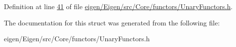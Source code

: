 Definition at line \hyperlink{eigen_2_eigen_2src_2_core_2functors_2_unary_functors_8h_source_l00041}{41} of file \hyperlink{eigen_2_eigen_2src_2_core_2functors_2_unary_functors_8h_source}{eigen/\+Eigen/src/\+Core/functors/\+Unary\+Functors.\+h}.



The documentation for this struct was generated from the following file\+:\begin{DoxyCompactItemize}
\item 
eigen/\+Eigen/src/\+Core/functors/\+Unary\+Functors.\+h\end{DoxyCompactItemize}
